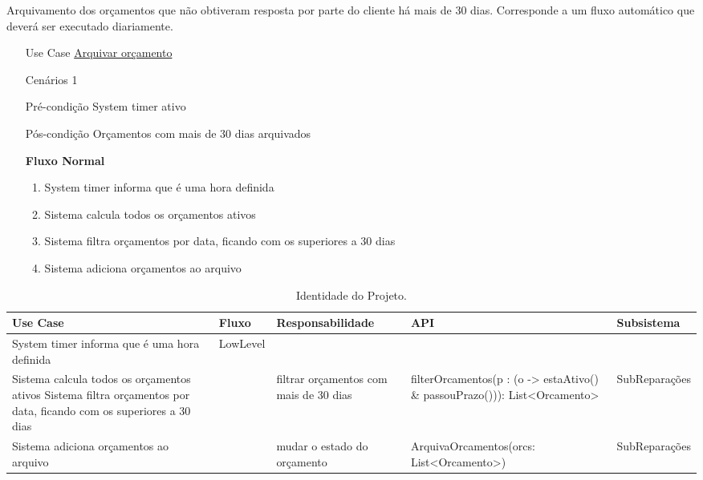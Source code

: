 \documentclass[../relatorio.tex]{subfiles}
\begin{document}
Arquivamento dos orçamentos que não obtiveram resposta por parte do cliente há mais de 30 dias.
Corresponde a um fluxo automático que deverá ser executado diariamente.
\begin{itemize}
    \item[Use Case] {\underline{Arquivar orçamento}}
    \item[Cenários] {1}
    \item[Pré-condição] {System timer ativo}
    \item[Pós-condição] {Orçamentos com mais de 30 dias arquivados}
          \begin{flushleft}
              \textbf{Fluxo Normal}
          \end{flushleft}
          \begin{enumerate}
              \item System timer informa que é uma hora definida
              \item Sistema calcula todos os orçamentos ativos
              \item Sistema filtra orçamentos por data, ficando com os superiores a 30 dias
              \item Sistema adiciona orçamentos ao arquivo
          \end{enumerate}
\end{itemize}
\begin{landscape}
    \begin{table}[!h]
        \centering
        \begin{tabular}{|p{5cm}|p{1cm}|p{4cm}|p{6cm}|p{3cm}|}
            \hline
            \rowcolor{gray!20!white}
            Use Case & Fluxo    & Responsabilidade & API & Subsistema    \\
            \hline
            \rowcolor{red}
            System timer informa que é uma hora definida
                    & LowLevel 
                    &                                        
                    &                                                          
                    &               
            \\
            \hline
            Sistema calcula todos os orçamentos ativos                              
            Sistema filtra orçamentos por data, ficando com os superiores a 30 dias 
                    &          
                    & filtrar orçamentos com mais de 30 dias 
                    & filterOrcamentos(p : (o -> estaAtivo() \& passouPrazo())): List<Orcamento> 
                    & SubReparações 
            \\
            \hline
            Sistema adiciona orçamentos ao arquivo                                  
                    &          
                    & mudar o estado do orçamento    
                    & ArquivaOrcamentos(orcs: List<Orcamento>)                        
                    & SubReparações 
            \\
            \hline
        \end{tabular}
        \caption{Identidade do Projeto.}
    \end{table}
\end{landscape}
\end{document}
